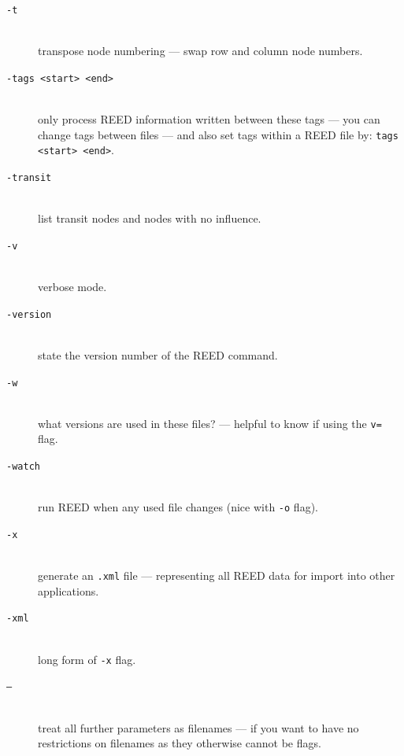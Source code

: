 \begin{description}
\item[\tt -t]~\\ transpose node numbering --- swap row and column node numbers.

\item[\tt -tags <start> <end>]~\\ only process REED information written between these tags --- you can change tags between files --- and also set tags within a REED file by: \texttt{tags <start> <end>}.

\item[\tt -transit]~\\ list transit nodes and nodes with no influence.

\item[\tt -v]~\\ verbose mode.

\item[\tt -version]~\\ state the version number of the REED command.

\item[\tt -w]~\\ what versions are used in these files? --- helpful to know if using the \texttt{v=} flag.

\item[\tt -watch]~\\ run REED when any used file changes (nice with \texttt{-o} flag).

\item[\tt -x]~\\ generate an \texttt{.xml} file --- representing all REED data for import into other applications.

\item[\tt -xml]~\\ long form of \texttt{-x} flag.

\item[\tt --]~\\ treat all further parameters as filenames --- if you want to have no restrictions on filenames as they otherwise cannot be flags.

\end{description}

